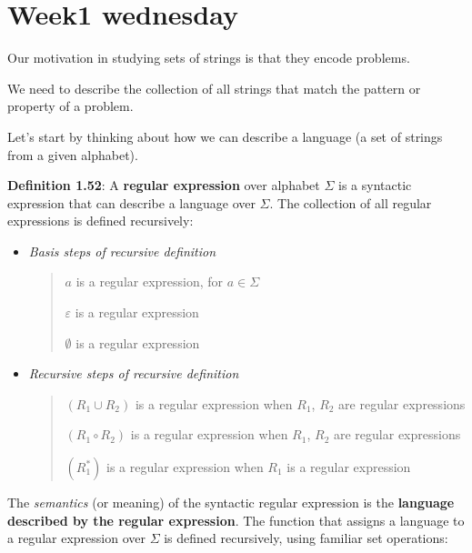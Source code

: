 \documentclass[12pt, oneside]{article}
\begin{document}
\begin{flushright}
\end{flushright} \section*{Week1 wednesday}


Our motivation in studying sets of strings is that they encode problems.

We need to describe the collection of all strings that match the pattern or property of a problem.

Let's start by thinking about how we can describe a language (a set of strings from a given alphabet).

\vfill


{\bf Definition 1.52}: A {\bf regular expression} over alphabet $\Sigma$
is a syntactic expression that can describe a language over $\Sigma$. The collection of all regular
expressions is defined recursively:
\begin{itemize}
\item[] {\it Basis steps of recursive definition}
\begin{quote}    
    $a$ is a regular expression, for $a \in \Sigma$

    $\varepsilon$ is a regular expression

    $\emptyset$ is a regular expression
\end{quote}

\item[] {\it Recursive steps of recursive definition}
\begin{quote}
    $(R_1 \cup R_2)$ is a regular expression when $R_1$, $R_2$ are regular expressions 

    $(R_1 \circ R_2)$ is a regular expression when $R_1$, $R_2$ are regular expressions

    $(R_1^*)$ is a regular expression when $R_1$ is a regular expression 
\end{quote}
\end{itemize}
 

The {\it semantics} (or meaning) of the syntactic regular expression is the {\bf language
described by the regular expression}. The function that assigns a language to a regular expression
over $\Sigma$ is defined recursively, using familiar set operations:
\end{document}
